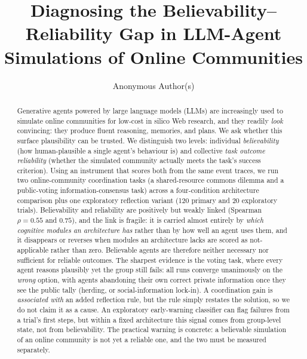 \documentclass[runningheads]{llncs}
\begin{document}
\title{Diagnosing the Believability--Reliability Gap in LLM-Agent Simulations of Online Communities}
\author{Anonymous Author(s)}
\maketitle


\begin{abstract}
Generative agents powered by large language models (LLMs) are increasingly used to
simulate online communities for low-cost in silico Web research, and they readily
\emph{look} convincing: they produce fluent reasoning, memories, and plans. We ask
whether this surface plausibility can be trusted. We distinguish two levels: individual
\emph{believability} (how human-plausible a single agent's behaviour is) and collective
\emph{task outcome reliability} (whether the simulated community actually meets the
task's success criterion). Using an instrument that scores both from the same event
traces, we run two online-community coordination tasks (a shared-resource commons
dilemma and a public-voting information-consensus task) across a four-condition
architecture comparison plus one exploratory reflection variant (120 primary and 20
exploratory trials). Believability and reliability are positively but weakly linked
(Spearman $\rho=0.55$ and $0.75$), and the link is fragile: it is carried almost entirely
by \emph{which cognitive modules an architecture has} rather than by how well an agent
uses them, and it disappears or reverses when modules an architecture lacks are scored as
not-applicable rather than zero. Believable agents are therefore neither necessary nor
sufficient for reliable outcomes. The sharpest evidence is the voting task, where every
agent reasons plausibly yet the group still fails: all runs converge unanimously on the
\emph{wrong} option, with agents abandoning their own correct private information once
they see the public tally (herding, or social-information lock-in). A coordination gain
is \emph{associated with} an added reflection rule, but the rule simply restates the
solution, so we do not claim it as a cause. An exploratory early-warning classifier can
flag failures from a trial's first steps, but within a fixed architecture this signal
comes from group-level state, not from believability. The practical warning is concrete:
a believable simulation of an online community is not yet a reliable one, and the two must
be measured separately.
\end{abstract}
\end{document}
